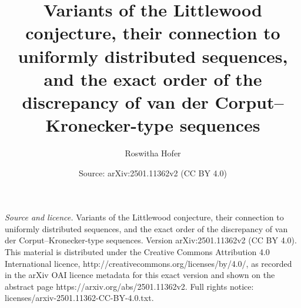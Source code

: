 \documentclass[10pt,a4paper]{amsart}
\renewcommand{\(}{\left (}
\renewcommand{\)}{\right )}
\theoremstyle{definition}
\numberwithin{equation}{section}
\begin{document}
\title[Identifying van der Corput--Kronecker-type sequences as digital sequences]{Variants of the Littlewood conjecture, their connection to uniformly distributed sequences, and the exact order of the discrepancy of van der Corput--Kronecker-type sequences}
\author{Roswitha Hofer}
\date{Source: arXiv:2501.11362v2 (CC BY 4.0)}
\maketitle
\noindent\emph{Source and licence.} Variants of the Littlewood conjecture, their connection to uniformly distributed sequences, and the exact order of the discrepancy of van der Corput--Kronecker-type sequences. Version arXiv:2501.11362v2 (CC BY 4.0). This material is distributed under the Creative Commons Attribution 4.0 International licence, http://creativecommons.org/licenses/by/4.0/, as recorded in the arXiv OAI licence metadata for this exact version and shown on the abstract page https://arxiv.org/abs/2501.11362v2. Full rights notice: licenses/arxiv-2501.11362-CC-BY-4.0.txt.\par\smallskip
\end{document}
